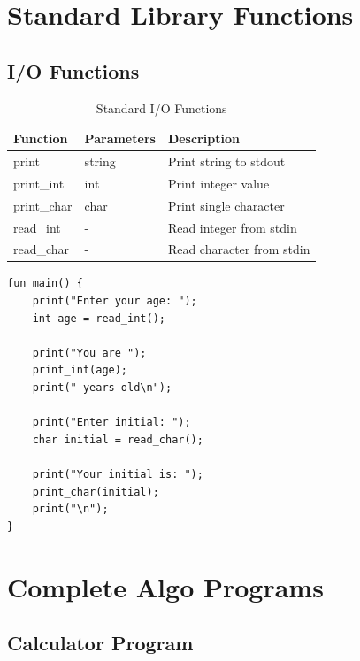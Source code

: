 \documentclass[12pt,a4paper,oneside]{book}
\begin{document}
\chapter{Standard Library Functions}

\section{I/O Functions}

\begin{table}[H]
\centering
\caption{Standard I/O Functions}
\begin{tabularx}{\textwidth}{|l|l|X|}
\hline
\textbf{Function} & \textbf{Parameters} & \textbf{Description} \\
\hline
print & string & Print string to stdout \\
print\_int & int & Print integer value \\
print\_char & char & Print single character \\
read\_int & - & Read integer from stdin \\
read\_char & - & Read character from stdin \\
\hline
\end{tabularx}
\end{table}

\begin{lstlisting}[style=algo, caption={Using I/O Functions}]
fun main() {
    print("Enter your age: ");
    int age = read_int();
    
    print("You are ");
    print_int(age);
    print(" years old\n");
    
    print("Enter initial: ");
    char initial = read_char();
    
    print("Your initial is: ");
    print_char(initial);
    print("\n");
}
\end{lstlisting}

\chapter{Complete Algo Programs}

\section{Calculator Program}
\end{document}
